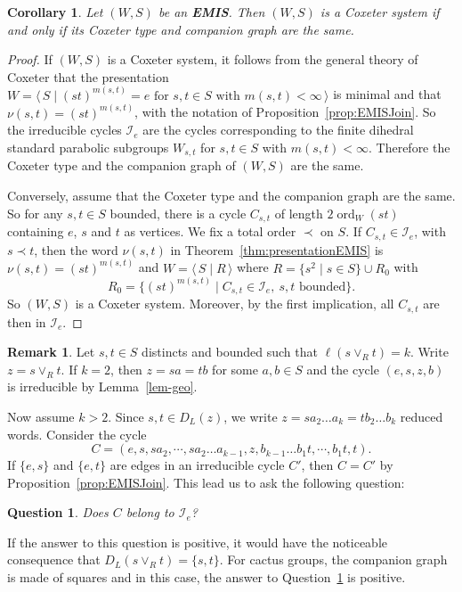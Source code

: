 \documentclass[A4paper, oneside]{amsart}
\newcommand{\id}{\textit{e}}
\newcommand{\mpair}[1]{\langle\, #1\,\rangle}  %
\newcommand{\ord}{\operatorname{ord}}
\newcommand{\Irr}{\mathcal{I}}
\newcommand{\EMIS}{\textnormal{\bf EMIS}\xspace}
\newtheorem{cor}[thm]{Corollary}
\newtheorem{question}{Question}
\theoremstyle{definition}
\newtheorem{rem}[thm]{Remark}
\begin{document}
\begin{cor}\label{cor:CompanionCox} Let $(W,S)$ be an \EMIS. Then $(W,S)$ is a Coxeter system if and only if its Coxeter type and companion graph are the same. 
\end{cor}
\begin{proof} If $(W,S)$ is a Coxeter system, it follows from the general theory of Coxeter that the presentation $W=\mpair{S\mid (st)^{m(s,t)}=e \text{ for }s,t\in S\text{ with }m(s,t)<\infty }$ is minimal and that $\nu(s,t)=(st)^{m(s,t)}$, with the notation of Proposition~\ref{prop:EMISJoin}. So the irreducible cycles $\Irr_\id$ are the cycles corresponding to the finite dihedral standard parabolic subgroups $W_{s,t}$ for $s,t\in S$ with $m(s,t)<\infty$. Therefore the Coxeter type and the companion graph of $(W,S)$ are the same. 

Conversely, assume that the Coxeter type and the companion graph are the same. So for any $s,t\in S$ bounded, there is a cycle $C_{s,t}$ of length  $2\ord_W(st)$ containing $e$, $s$ and $t$ as vertices. We fix a total order $\prec$ on $S$. If $C_{s,t}\in \Irr_\id$, with $s\prec t$, then the word $\nu(s,t)$ in Theorem~\ref{thm:presentationEMIS} is $\nu(s,t)=(st)^{m(s,t)}$ and $W=\mpair{S\mid R}$ where $R=\{s^2\mid s\in S\}\cup R_0$ with
$$
R_0=\{(st)^{m(s,t)}\mid C_{s,t}\in\Irr_\id, \ s,t\textrm{ bounded} \}.
$$
So $(W,S)$ is a Coxeter system. Moreover, by the first implication, all $C_{s,t}$ are then in $\Irr_\id$.
\end{proof}

\begin{rem}
\label{rem:JoinIrred} Let $s,t\in S$ distincts and bounded such that $\ell(s\vee_R t)=k$. Write $z=s\vee_R  t$. If $k=2$, then $z=sa=tb$ for some $a,b\in S$ and the cycle $(\id, s,z,b)$ is irreducible by  Lemma~\ref{lem-geo}. 

Now assume $k>2$. Since $s,t\in D_L(z)$, we write $z=sa_2\dots a_k=tb_2\dots b_k$ reduced words.  Consider the cycle 
$$
C=(\id,s,sa_2,\cdots, sa_2\dots a_{k-1},z,b_{k-1}\dots b_1t,\cdots, b_1t,t).
$$
If $\{e,s\}$ and $\{e,t\}$ are edges in an irreducible cycle $C'$, then $C=C'$ by Proposition~\ref{prop:EMISJoin}. This lead us to ask the following question:  

\begin{question}\label{qu:Join} Does $C$ belong to $\Irr_\id$?  
\end{question}
If the answer to this question is positive, it would have the noticeable consequence that $D_L(s\vee_R t)=\{s,t\}$.  For cactus groups, the companion graph is made of squares and in this case, the answer to Question~\ref{qu:Join} is positive. 
\end{rem}
\end{document}
